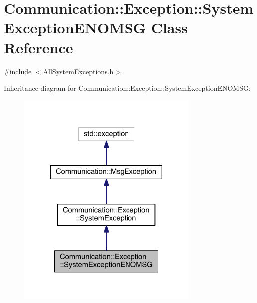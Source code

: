 \hypertarget{class_communication_1_1_exception_1_1_system_exception_e_n_o_m_s_g}{}\section{Communication\+:\+:Exception\+:\+:System\+Exception\+E\+N\+O\+M\+S\+G Class Reference}
\label{class_communication_1_1_exception_1_1_system_exception_e_n_o_m_s_g}


{\ttfamily \#include $<$All\+System\+Exceptions.\+h$>$}



Inheritance diagram for Communication\+:\+:Exception\+:\+:System\+Exception\+E\+N\+O\+M\+S\+G\+:\nopagebreak
\begin{figure}[H]
\begin{center}
\leavevmode
\includegraphics[width=248pt]{class_communication_1_1_exception_1_1_system_exception_e_n_o_m_s_g__inherit__graph}
\end{center}
\end{figure}


